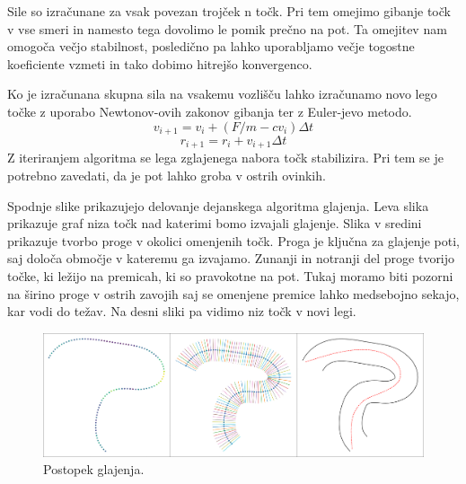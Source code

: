 \documentclass[10pt,a4paper]{article}
\begin{document}
Sile so izračunane za vsak povezan trojček n točk. Pri tem omejimo gibanje točk v vse smeri in namesto tega dovolimo le pomik prečno na pot. Ta omejitev nam omogoča večjo stabilnost, posledično pa lahko uporabljamo večje togostne koeficiente vzmeti in tako dobimo hitrejšo konvergenco.

Ko je izračunana skupna sila na vsakemu vozlišču lahko izračunamo novo lego točke z uporabo Newtonov-ovih zakonov gibanja ter z Euler-jevo metodo.
\begin{equation}
v_{i + 1} = v_i + (F/m - cv_{i})\Delta t
\end{equation}
\begin{equation}
r_{i + 1} = r_{i} + v_{i + 1} \Delta t 
\end{equation}
Z iteriranjem algoritma se lega zglajenega nabora točk stabilizira. Pri tem se je potrebno zavedati, da je pot lahko groba v ostrih ovinkih.

Spodnje slike prikazujejo delovanje dejanskega algoritma glajenja. Leva slika prikazuje graf niza točk nad katerimi bomo  izvajali glajenje. Slika v sredini prikazuje tvorbo proge v okolici omenjenih točk. Proga je ključna za glajenje poti, saj določa območje v kateremu ga izvajamo. Zunanji in notranji del proge tvorijo točke, ki ležijo na premicah, ki so pravokotne na pot. Tukaj 
moramo biti pozorni na širino proge v ostrih zavojih saj se omenjene premice lahko medsebojno sekajo, kar vodi do težav. Na desni sliki pa vidimo niz točk v novi legi.

\begin{figure}[H]
	\centering
	\includegraphics[width=15cm]{pic/slika6.png}
	\caption{Postopek glajenja.}
	\label{fig:slika}
\end{figure}
\end{document}
